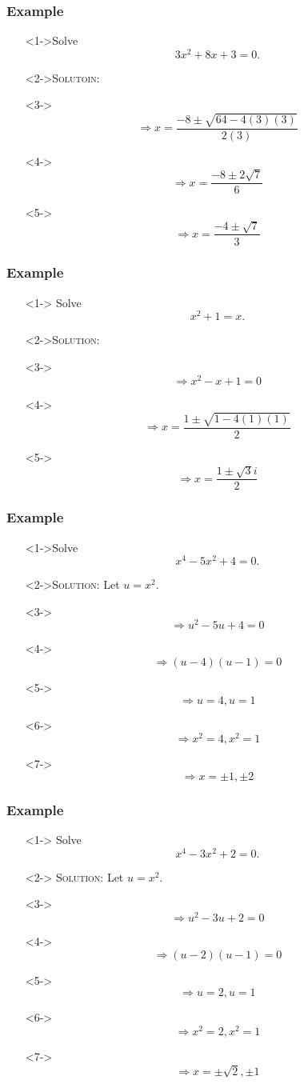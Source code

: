 \documentclass[handout]{beamer}
\begin{document}
\begin{frame}
	\frametitle{Example}
	\begin{enumerate}
		\item[]<1->Solve \[ 3x^{2}+8x+3=0. \]
		\item[]<2->\textsc{Solutoin:}
		\item[]<3->\[ \Rightarrow x=\frac{-8 \pm \sqrt{64-4(3)(3)}}{2(3)} \]
		\item[]<4-> \[ \Rightarrow x=\frac{-8 \pm 2\sqrt{7}}{6} \]
		\item[]<5-> \[ \Rightarrow x=\frac{-4 \pm \sqrt{7}}{3} \]
	\end{enumerate}
\end{frame}

\begin{frame}
	\frametitle{Example}
	\begin{enumerate}
		\item[]<1-> Solve \[ x^{2}+1=x. \]
		\item[]<2->\textsc{Solution:}
		\item[]<3-> \[ \Rightarrow x^{2}-x+1=0 \]
		\item[]<4-> \[ \Rightarrow x=\frac{1\pm \sqrt{1-4(1)(1)}}{2}\]
		\item[]<5-> \[ \Rightarrow x=\frac{1 \pm \sqrt{3} i}{2}\]
	\end{enumerate}
\end{frame}

\begin{frame}
	\frametitle{Example}
	\begin{enumerate}
		\item[]<1->Solve \[ x^{4}-5x^{2}+4=0. \]
		\item[]<2->\textsc{Solution:} Let $u=x^{2}$.
		\item[]<3-> \[ \Rightarrow u^{2}-5u+4=0 \]
		\item[]<4->\[ \Rightarrow (u-4)(u-1)=0\]
		\item[]<5->\[ \Rightarrow u=4, u=1 \]
		\item[]<6-> \[ \Rightarrow x^{2}=4, x^{2}=1 \]
		\item[]<7-> \[ \Rightarrow x=\pm 1, \pm 2 \]
	\end{enumerate}
\end{frame}

\begin{frame}
	\frametitle{Example}
	\begin{enumerate}
		\item[]<1-> Solve \[ x^{4}-3x^{2}+2=0. \]
		\item[]<2-> \textsc{Solution:} Let $u=x^{2}$.
		\item[]<3-> \[ \Rightarrow u^{2}-3u+2=0 \]
		\item[]<4-> \[ \Rightarrow (u-2)(u-1)=0 \]
		\item[]<5-> \[ \Rightarrow u=2, u=1 \]
		\item[]<6-> \[ \Rightarrow x^{2}=2, x^{2}=1 \]
		\item[]<7-> \[ \Rightarrow x=\pm \sqrt{2}, \pm 1 \]
	\end{enumerate}
\end{frame}
\end{document}

